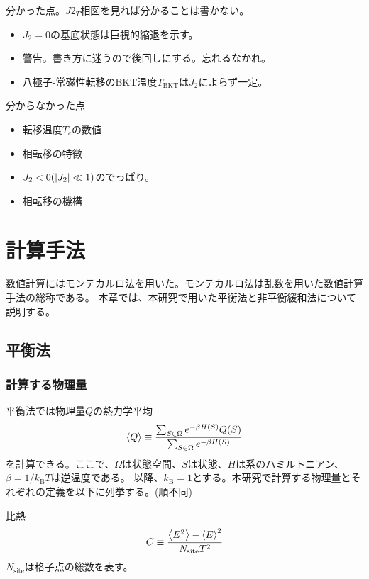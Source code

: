 \documentclass[12pt,titlepage,dvipdfmx]{jarticle}
\begin{document}
分かった点。$J2_T$相図を見れば分かることは書かない。
\begin{itemize}
   \item $J_2=0$の基底状態は巨視的縮退を示す。
   \item 警告。書き方に迷うので後回しにする。忘れるなかれ。
   \item 八極子-常磁性転移のBKT温度$T_{\mathrm{BKT}}$は$J_2$によらず一定。
\end{itemize}

分からなかった点
\begin{itemize}
   \item 転移温度$T_c$の数値
   \item 相転移の特徴
   \item $J_2<0(\abs{J_2}\ll1)$のでっぱり。
   \item 相転移の機構
\end{itemize}

\newpage


\newpage

\section{計算手法}

数値計算にはモンテカルロ法を用いた。モンテカルロ法は乱数を用いた数値計算手法の総称である。
本章では、本研究で用いた平衡法と非平衡緩和法について説明する。

\subsection{平衡法}
\subsubsection{計算する物理量}

平衡法では物理量$Q$の熱力学平均
\begin{align}
   \ev{Q} \equiv \frac{\sum_{S\in\Omega}e^{-\beta H(S)}Q(S)}{\sum_{S\in\Omega}e^{-\beta H(S)}}
\end{align}
を計算できる。ここで、$\Omega$は状態空間、$S$は状態、$H$は系のハミルトニアン、$\beta=1/k_{\mathrm{B}}T$は逆温度である。
以降、$k_{\mathrm{B}}=1$とする。本研究で計算する物理量とそれぞれの定義を以下に列挙する。(順不同)

比熱
\begin{align}
   C \equiv \frac{\ev{E^2}-\ev{E}^2}{N_{\mathrm{site}}T^2}
\end{align}
$N_{\mathrm{site}}$は格子点の総数を表す。
\end{document}
